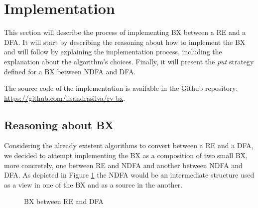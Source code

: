 \section{Implementation}
This section will describe the process of implementing BX between a RE and a DFA. It will start by describing the reasoning about how to implement the BX and will follow by explaining the implementation process, including the explanation about the algorithm's choices. Finally, it will present the \textit{put} strategy defined for a BX between NDFA and DFA.

The source code of the implementation is available in the Github repository:  \url{https://github.com/lisandrasilva/rv-bx}.

\subsection{Reasoning about BX}
Considering the already existent algorithms to convert between a RE and a DFA, we decided to attempt implementing the BX as a composition of two small BX, more concretely, one between RE and NDFA and another between NDFA and DFA. As depicted in Figure \ref{fig:BX} the NDFA would be an intermediate structure used as a view in one of the BX and as a source in the another.  

\begin{figure}
    \centering
    \caption{BX between RE and DFA}
    \label{fig:BX}
\end{figure}

